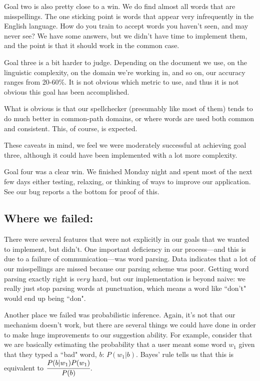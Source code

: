 \documentclass[a4paper]{article}
\begin{document}
Goal two is also pretty close to a win. We do find almost all words that are misspellings. The one sticking point is words that appear very infrequently in the English language. How do you train to accept words you haven't seen, and may never see? We have some answers, but we didn't have time to implement them, and the point is that it should work in the common case.

Goal three is a bit harder to judge. Depending on the document we use, on the linguistic complexity, on the domain we're working in, and so on, our accuracy ranges from 20-60\%. It is not obvious which metric to use, and thus it is not obvious this goal has been accomplished.

What is obvious is that our spellchecker (presumably like most of them) tends to do much better in common-path domains, or where words are used both common and consistent. This, of course, is expected.

These caveats in mind, we feel we were moderately successful at achieving goal three, although it could have been implemented with a lot more complexity.

Goal four was a clear win. We finished Monday night and spent most of the next few days either testing, relaxing, or thinking of ways to improve our application. See our bug reports a the bottom for proof of this.

\subsection*{Where we failed:}

There were several features that were not explicitly in our goals that we wanted to implement, but didn't. One important deficiency in our process---and this is due to a failure of communication---was word parsing. Data indicates that a lot of our misspellings are missed because our parsing scheme was poor. Getting word parsing exactly right is $\textit{very}$ hard, but our implementation is beyond naive: we really just stop parsing words at punctuation, which means a word like ``don't" would end up being ``don".

Another place we failed was probabilistic inference. Again, it's not that our mechanism doesn't work, but there are several things we could have done in order to make huge improvements to our suggestion ability. For example, consider that we are basically estimating the probability that a user meant some word $w_1$ given that they typed a ``bad" word, $b$: $P(w_1|b)$. Bayes' rule tells us that this is equivalent to $\cfrac{P(b|w_1)P(w_1)}{P(b)}$.
\end{document}
